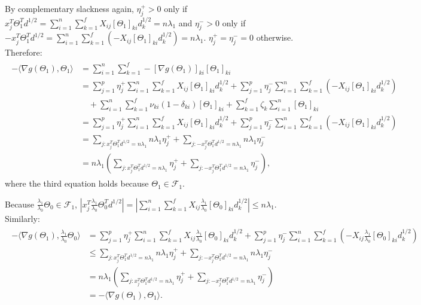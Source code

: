 By complementary slackness again, $\eta^+_j>0$ only if $x_j^T\Theta_{1}^Td^{1/2}=\sum_{i=1}^n\sum_{k=1}^fX_{ij}[\Theta_1]_{ki}d_k^{1/2}=n\lambda_1$ and $\eta^-_j>0$ only if $-x_j^T\Theta_{1}^Td^{1/2}=\sum_{i=1}^n\sum_{k=1}^f(-X_{ij}[\Theta_1]_{ki}d_k^{1/2})=n\lambda_1$. $\eta^+_j=\eta^-_j=0$ otherwise. Therefore:
\begin{gather}
    \label{eq:thm2.5}
    \begin{aligned}
        -\langle\nabla g(\Theta_{1}),\Theta_{1}\rangle&=\sum_{i=1}^n\sum_{k=1}^f-[\nabla g(\Theta_{1})]_{ki}[\Theta_1]_{ki}\\
        &=\sum_{j=1}^p\eta^+_j\sum_{i=1}^n\sum_{k=1}^fX_{ij}[\Theta_1]_{ki}d_k^{1/2}+\sum_{j=1}^p\eta^-_j\sum_{i=1}^n\sum_{k=1}^f(-X_{ij}[\Theta_1]_{ki}d_k^{1/2})\\
        &\quad+\sum_{i=1}^n\sum_{k=1}^f\nu_{ki}(1-\delta_{ki})[\Theta_1]_{ki}+\sum_{k=1}^f\zeta_{k}\sum_{i=1}^n[\Theta_1]_{ki}\\
        &=\sum_{j=1}^p\eta^+_j\sum_{i=1}^n\sum_{k=1}^fX_{ij}[\Theta_1]_{ki}d_k^{1/2}+\sum_{j=1}^p\eta^-_j\sum_{i=1}^n\sum_{k=1}^f(-X_{ij}[\Theta_1]_{ki}d_k^{1/2})\\
        &=\sum_{j:x_j^T\Theta_{1}^Td^{1/2}=n\lambda_1}n\lambda_1\eta_j^++\sum_{j:-x_j^T\Theta_{1}^Td^{1/2}=n\lambda_1}n\lambda_1\eta_j^-\\
        &=n\lambda_1\left(\sum_{j:x_j^T\Theta_{1}^Td^{1/2}=n\lambda_1}\eta_j^++\sum_{j:-x_j^T\Theta_{1}^Td^{1/2}=n\lambda_1}\eta_j^-\right),
    \end{aligned}
\end{gather}
where the third equation holds because $\Theta_{1}\in\mathcal{F}_{1}$.

Because $\frac{\lambda_1}{\lambda_0}\Theta_{0}\in \mathcal{F}_{1}$, $\left|x_j^T\frac{\lambda_1}{\lambda_0}\Theta_{0}^Td^{1/2}\right|=\left|\sum_{i=1}^n\sum_{k=1}^fX_{ij}\frac{\lambda_1}{\lambda_0}[\Theta_0]_{ki}d_k^{1/2}\right|\leq n\lambda_1$. Similarly:
\begin{gather}
    \label{eq:thm2.6}
    \begin{aligned}
        -\langle\nabla g(\Theta_{1}),\frac{\lambda_1}{\lambda_0}\Theta_{0}\rangle
        &=\sum_{j=1}^p\eta^+_j\sum_{i=1}^n\sum_{k=1}^fX_{ij}\frac{\lambda_1}{\lambda_0}[\Theta_0]_{ki}d_k^{1/2}+\sum_{j=1}^p\eta^-_j\sum_{i=1}^n\sum_{k=1}^f(-X_{ij}\frac{\lambda_1}{\lambda_0}[\Theta_0]_{ki}d_k^{1/2})\\
        &\leq\sum_{j:x_j^T\Theta_{1}^Td^{1/2}=n\lambda_1}n\lambda_1\eta_j^++\sum_{j:-x_j^T\Theta_{1}^Td^{1/2}=n\lambda_1}n\lambda_1\eta_j^-\\
        &=n\lambda_1\left(\sum_{j:x_j^T\Theta_{1}^Td^{1/2}=n\lambda_1}\eta_j^++\sum_{j:-x_j^T\Theta_{1}^Td^{1/2}=n\lambda_1}\eta_j^-\right)\\
        &=-\langle\nabla g(\Theta_{1}),\Theta_{1}\rangle.
    \end{aligned}
\end{gather}

